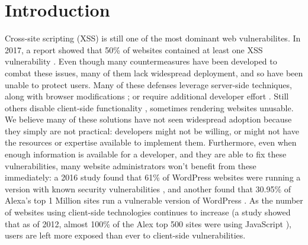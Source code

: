 \section{Introduction}

Cross-site scripting (XSS) is still one of the most dominant web vulnerabilites. In 2017, a report showed that 50\% of websites contained at least one XSS vulnerability \cite{Acunetix}. Even though many countermeasures have been developed to combat these issues, many of them lack widespread deployment, and so have been unable to protect users. Many of these defenses leverage server-side techniques, along with browser modifications \cite{Jim:2007:DSI:1242572.1242654,Nadji:2009}; or require additional developer effort \cite{10.1007/978-3-319-66399-9_7}. Still others disable client-side functionality \cite{Noscript,Snyder:2017:MWD:3133956.3133966}, sometimes rendering websites unusable. We believe many of these solutions have not seen widespread adoption because they simply are not practical: developers might not be willing, or might not have the resources or expertise available to implement them. Furthermore, even when enough information is available for a developer, and they are able to fix these vulnerabilities, many website administrators won't benefit from these immediately: a 2016 study found that 61\% of WordPress websites were running a version with known security vulnerabilities \cite{Sucuri}, and another found that 30.95\% of Alexa's top 1 Million sites run a vulnerable version of WordPress \cite{wpwhitesecurity}. As the number of websites using client-side technologies continues to increase (a study showed that as of 2012, almost 100\% of the Alex top 500 sites were using JavaScript \cite{Stock:2017:WTI:3241189.3241265}), users are left more exposed than ever to client-side vulnerabilities.


